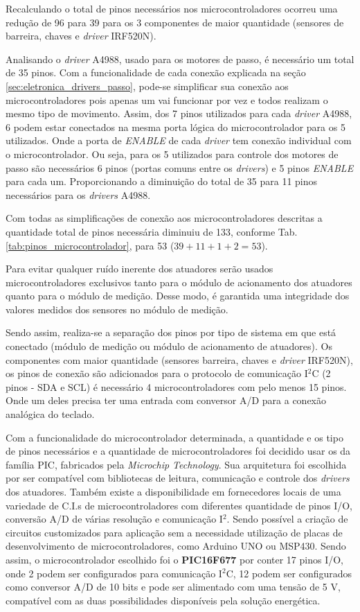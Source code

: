     Recalculando o total de pinos necessários nos microcontroladores ocorreu uma redução de 96 para 39 para os 3 componentes de maior quantidade (sensores de barreira, chaves e \textit{driver} IRF520N). 
    
    Analisando o \textit{driver} A4988, usado para os motores de passo, é necessário um total de 35 pinos. Com a funcionalidade de cada conexão explicada na seção \ref{sec:eletronica_drivers_passo}, pode-se simplificar sua conexão aos microcontroladores pois apenas um vai funcionar por vez e todos realizam o mesmo tipo de movimento. Assim, dos 7 pinos utilizados para cada \textit{driver} A4988, 6 podem estar conectados na mesma porta lógica do microcontrolador para os 5 utilizados. Onde a porta de \textit{ENABLE} de cada \textit{driver} tem conexão individual com o microcontrolador. Ou seja, para os 5 utilizados para controle dos motores de passo são necessários 6 pinos (portas comuns entre os \textit{drivers}) e 5 pinos \textit{ENABLE} para cada um. Proporcionando a diminuição do total de 35 para 11 pinos necessários para os \textit{drivers} A4988.
    
    Com todas as simplificações de conexão aos microcontroladores descritas a quantidade total de pinos necessária diminuiu de 133, conforme Tab. \ref{tab:pinos_microcontrolador}, para 53 ($39 + 11 + 1 + 2 = 53$).
    
    Para evitar qualquer ruído inerente dos atuadores serão usados microcontroladores exclusivos tanto para o módulo de acionamento dos atuadores quanto para o módulo de medição. Desse modo, é garantida uma integridade dos valores medidos dos sensores no módulo de medição.
    
    Sendo assim, realiza-se a separação dos pinos por tipo de sistema em que está conectado (módulo de medição ou módulo de acionamento de atuadores). Os componentes com maior quantidade (sensores barreira, chaves e \textit{driver} IRF520N), os pinos de conexão são adicionados para o protocolo de comunicação I$^2$C (2 pinos - SDA e SCL) é necessário 4 microcontroladores com pelo menos 15 pinos. Onde um deles precisa ter uma entrada com conversor A/D para a conexão analógica do teclado. 
    
    Com a funcionalidade do microcontrolador determinada, a quantidade e os tipo de pinos necessários e a quantidade de microcontroladores foi decidido usar os da família PIC, fabricados pela \textit{Microchip Technology}. Sua arquitetura foi escolhida por ser compatível com bibliotecas de leitura, comunicação e controle dos \textit{drivers} dos atuadores. Também existe a disponibilidade em fornecedores locais de uma variedade de C.I.s de microcontroladores com diferentes quantidade de pinos I/O, conversão A/D de várias resolução e comunicação I$^2$. Sendo  possível a criação de circuitos customizados para aplicação sem a necessidade utilização de placas de desenvolvimento de microcontroladores, como Arduino UNO ou MSP430. Sendo assim, o microcontrolador escolhido foi o \textbf{PIC16F677} por conter 17 pinos I/O, onde 2 podem ser configurados para comunicação I$^2$C, 12 podem ser configurados como conversor A/D de 10 bits e pode ser alimentado com uma tensão de 5 V, compatível com as duas possibilidades disponíveis pela solução energética.

